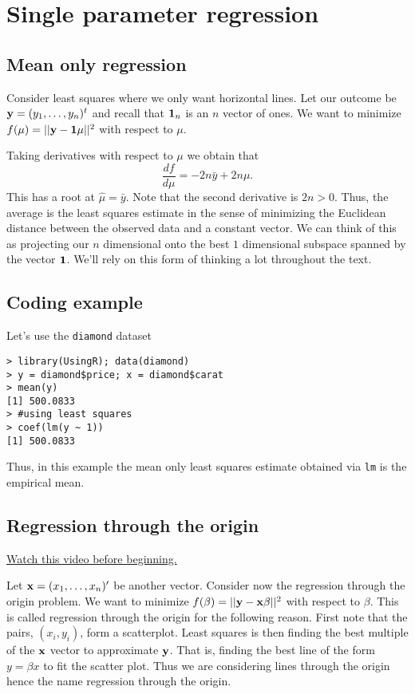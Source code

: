 \chapter{Single parameter regression}

\section{Mean only regression}



Consider least squares where we only want horizontal lines. 
Let our outcome be
$
\mathbf{y} = (y_1,\ldots, y_n)^t
$ and recall that $\mathbf{1}_n$ is an $n$ vector of ones. We want
to minimize 
$f(\mu) = ||\mathbf{y} - \mathbf{1} \mu ||^2$ with respect to $\mu$. 

Taking derivatives with respect to $\mu$ we obtain that
$$
\frac{d f}{d\mu} = - 2n \bar y  + 2 n \mu.
$$
This has a root at $\hat \mu = \bar y$. Note that the second
derivative is $2n>0$. 
Thus, the average is the least squares estimate in the
sense of minimizing the Euclidean distance between the
observed data and a constant vector. We can think of this
as projecting our $n$ dimensional onto the best $1$
dimensional subspace spanned by the vector $\mathbf{1}$. We'll
rely on this form of thinking a lot throughout the text.

\section{Coding example}

Let's use the \texttt{diamond} dataset 
\begin{verbatim}
> library(UsingR); data(diamond)
> y = diamond$price; x = diamond$carat
> mean(y)
[1] 500.0833
> #using least squares
> coef(lm(y ~ 1))
[1] 500.0833
\end{verbatim}
Thus, in this example the mean only least squares estimate obtained via \texttt{lm} is the empirical mean.

\section{Regression through the origin}

\href{https://www.youtube.com/watch?v=1ZFED8AcHWc&index=7&list=PLpl-gQkQivXhdgUCdaUQcdb31CRe8Mm2y}{Watch this video before beginning.}

Let $\mathbf{x} = (x_1,\ldots, x_n)'$ be another vector. Consider now the
regression through the origin problem. We want to minimize
$f(\beta) = ||\mathbf{y} - \mathbf{x} \beta ||^2$ with respect to $\beta$.
This is called regression through the origin for the following
reason. First note that the pairs, $(x_i, y_i)$,
form a scatterplot. Least squares is then finding the best
multiple of the $\mathbf{x}$ vector to approximate $\mathbf{y}$. That is,
finding the best line of the form $y = \beta x$ to fit
the scatter plot. Thus we are considering lines through the origin
hence the name regression through the origin.

